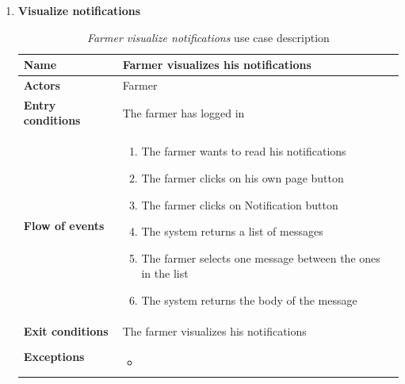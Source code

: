 \begin{enumerate}
    \item \textbf{Visualize notifications}
    \begin{longtable}{p{0.26\linewidth}p{0.75\linewidth}}
        \toprule
        \textbf{Name} & \textbf{Farmer visualizes his notifications} \\
        \midrule
        \textbf{Actors} & Farmer \\
        \midrule
        \textbf{Entry conditions} & The farmer has logged in\\
        \midrule
        \textbf{Flow of events} & 
        \begin{enumerate}
            \item The farmer wants to read his notifications
            \item The farmer clicks on his own page button
            \item The farmer clicks on Notification button
            \item The system returns a list of messages
            \item The farmer selects one message between the ones in the list
            \item The system returns the body of the message
        \end{enumerate} \\
        \midrule
        \textbf{Exit conditions} & The farmer visualizes his notifications\\
        \midrule
        \textbf{Exceptions} & 
        \begin{itemize}
            \item 
        \end{itemize}\\
        \bottomrule
        \caption{\emph{Farmer visualize notifications} use case description}
    \end{longtable}


\end{enumerate}

